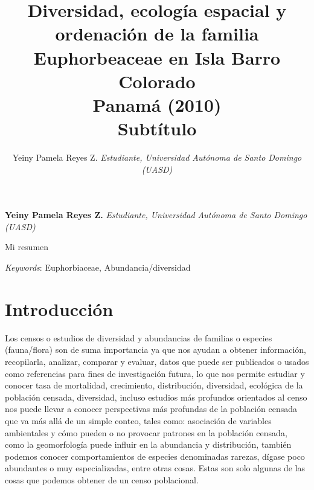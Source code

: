 \documentclass[11pt,]{article}
\title{Diversidad, ecología espacial y ordenación de la familia Euphorbeaceae
en Isla Barro Colorado\\
Panamá (2010)\\
Subtítulo  }
\author{\Large Yeiny Pamela Reyes Z.\vspace{0.05in} \newline\normalsize\emph{Estudiante, Universidad Autónoma de Santo Domingo (UASD)}  }
\date{}
\newcommand*{\authorfont}{\fontfamily{phv}\selectfont}
\renewenvironment{abstract}
 {{%
    \setlength{\leftmargin}{0mm}
    \setlength{\rightmargin}{\leftmargin}%
  }%
  \relax}
 {\endlist}
\begin{document}
	
%

{%
\setlength{\parindent}{0pt}
\thispagestyle{plain}
{\fontsize{18}{20}\selectfont\raggedright 
\maketitle  %

}

{
   \vskip 13.5pt\relax \normalsize\fontsize{11}{12} 
\textbf{\authorfont Yeiny Pamela Reyes Z.} \hskip 15pt \emph{\small Estudiante, Universidad Autónoma de Santo Domingo (UASD)}   

}

}








\begin{abstract}

    \hbox{\vrule height .2pt width 39.14pc}

    \vskip 8.5pt %

\noindent Mi resumen


\vskip 8.5pt \noindent \emph{Keywords}: Euphorbiaceae, Abundancia/diversidad \par

    \hbox{\vrule height .2pt width 39.14pc}



\end{abstract}


\vskip 6.5pt


\noindent  \section{Introducción}\label{introducciuxf3n}

Los censos o estudios de diversidad y abundancias de familias o especies
(fauna/flora) son de suma importancia ya que nos ayudan a obtener
información, recopilarla, analizar, comparar y evaluar, datos que puede
ser publicados o usados como referencias para fines de investigación
futura, lo que nos permite estudiar y conocer tasa de mortalidad,
crecimiento, distribución, diversidad, ecológica de la población
censada, diversidad, incluso estudios más profundos orientados al censo
nos puede llevar a conocer perspectivas más profundas de la población
censada que va más allá de un simple conteo, tales como: asociación de
variables ambientales y cómo pueden o no provocar patrones en la
población censada, como la geomorfología puede influir en la abundancia
y distribución, también podemos conocer comportamientos de especies
denominadas rarezas, dígase poco abundantes o muy especializadas, entre
otras cosas. Estas son solo algunas de las cosas que podemos obtener de
un censo poblacional.
\end{document}

